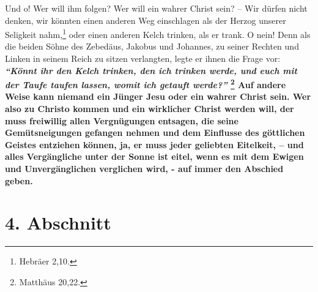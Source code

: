Und o! Wer will ihm folgen? Wer will ein wahrer Christ sein? -- Wir dürfen nicht
denken, wir könnten einen anderen Weg einschlagen als der Herzog unserer
Seligkeit nahm,\footnote{Hebräer 2,10.}
oder einen anderen Kelch trinken, als er
trank. O nein! Denn als die beiden Söhne des Zebedäus,
Jakobus und Johannes, zu
seiner Rechten und Linken in seinem Reich zu sitzen verlangten, legte er ihnen
die Frage vor:
\label{ref:16_03_kelch_tringen}
\textbf{\textit{"`Könnt ihr den Kelch trinken, den ich trinken werde, und euch
mit der Taufe taufen lassen, womit ich getauft werde?"'}
\footnote{Matthäus 20,22.}
Auf andere Weise kann niemand ein Jünger Jesu oder ein wahrer Christ sein. Wer
also zu Christo kommen und ein wirklicher Christ werden will, der muss
freiwillig
allen Vergnügungen entsagen, die seine Gemütsneigungen gefangen nehmen und dem
Einflusse des göttlichen Geistes entziehen können, ja, er muss jeder geliebten
Eitelkeit, -- und alles Vergängliche unter der Sonne ist eitel, wenn es mit dem
Ewigen und Unvergänglichen verglichen wird, - auf immer den Abschied geben.}

\section{4. Abschnitt} \label{kap16_ab4}

